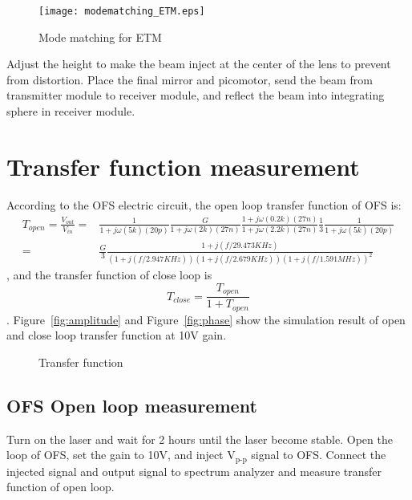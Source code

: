 \begin{figure}
	\begin{center}
		\texttt{[image: modematching\_ETM.eps]}
		\caption{Mode matching for ETM}
		\label{fig:modematching_ETM} 
	\end{center}
\end{figure}

Adjust the height to make the beam inject at the center of the lens to prevent from distortion. Place the final mirror and picomotor, send the beam from transmitter module to receiver module, and reflect the beam into integrating sphere in receiver module.

\section{Transfer function measurement}

According to the OFS electric circuit, the open loop transfer function of OFS is:
\begin{eqnarray}
T_{open}=\frac{V_{out}}{V_{in}}=&\frac{1}{1+j\omega(5k)(20p)}\frac{G}{1+j\omega(2k)(27n)}\frac{1+j\omega(0.2k)(27n)}{1+j\omega(2.2k)(27n)}\frac{1}{3}\frac{1}{1+j\omega(5k)(20p)}\\
=&\frac{G}{3}\frac{1+j(f/29.473KHz)}{(1+j(f/2.947KHz))(1+j(f/2.679KHz))(1+j(f/1.591MHz))^{2}}
\end{eqnarray},
and the transfer function of close loop is 
\begin{equation}
T_{close}=\frac{T_{open}}{1+T_{open}}
\end{equation}.
Figure~\ref{fig:amplitude} and Figure~\ref{fig:phase} show the simulation result of open and close loop transfer function at 10V gain.

\begin{figure}
	\begin{center}
	\caption{Transfer function}
	\label{fig:transferfunction}
	\end{center}
\end{figure}


\subsection{OFS Open loop measurement}

Turn on the laser and wait for 2 hours until the laser become stable. Open the loop of OFS, set the gain to 10V, and inject \underline{\qquad} $\mbox{V}_{\mbox{p-p}}$ signal to OFS. Connect the injected signal and output signal to spectrum analyzer and measure transfer function of open loop.
